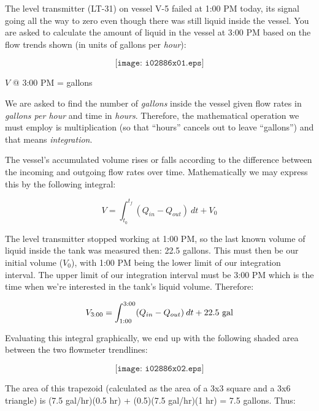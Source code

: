 

The level transmitter (LT-31) on vessel V-5 failed at 1:00 PM today, its signal going all the way to zero even though there was still liquid inside the vessel.  You are asked to calculate the amount of liquid in the vessel at 3:00 PM based on the flow trends shown (in units of gallons per {\it hour}):

$$\texttt{[image: i02886x01.eps]}$$

$V$ @ 3:00 PM = \underbar{\hskip 50pt} gallons

\vskip 10pt







We are asked to find the number of {\it gallons} inside the vessel given flow rates in {\it gallons per hour} and time in {\it hours}.  Therefore, the mathematical operation we must employ is multiplication (so that ``hours'' cancels out to leave ``gallons'') and that means {\it integration}.

The vessel's accumulated volume rises or falls according to the difference between the incoming and outgoing flow rates over time.  Mathematically we may express this by the following integral:

$$V = \int_{t_0}^{t_f} (Q_{in} - Q_{out}) \> dt + V_0$$

The level transmitter stopped working at 1:00 PM, so the last known volume of liquid inside the tank was measured then: 22.5 gallons.  This must then be our initial volume ($V_0$), with 1:00 PM being the lower limit of our integration interval.  The upper limit of our integration interval must be 3:00 PM which is the time when we're interested in the tank's liquid volume.  Therefore:

$$V_{3:00} = \int_{1:00}^{3:00} (Q_{in} - Q_{out}) \> dt + 22.5 \hbox{ gal}$$

Evaluating this integral graphically, we end up with the following shaded area between the two flowmeter trendlines:

$$\texttt{[image: i02886x02.eps]}$$

The area of this trapezoid (calculated as the area of a 3x3 square and a 3x6 triangle) is (7.5 gal/hr)(0.5 hr) + (0.5)(7.5 gal/hr)(1 hr) = 7.5 gallons.  Thus:

